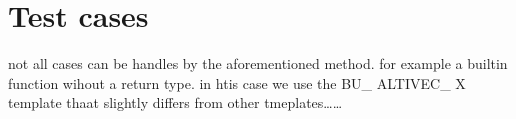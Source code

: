 \chapter{Test cases}
\label{chapter:tests}

not all cases can be handles by the aforementioned method. for example a builtin function wihout a return type. in  htis case we use the BU\_ ALTIVEC\_ X template thaat slightly differs from other tmeplates……

